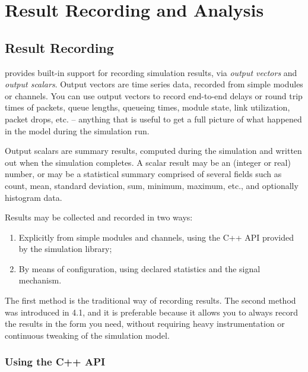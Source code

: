 \chapter{Result Recording and Analysis}
\label{cha:analyzing-simulation-results}

\section{Result Recording}

{\opp} provides built-in support for recording simulation results, via
\textit{output vectors} and \textit{output scalars}. Output vectors are
time series data, recorded from simple modules or channels. You can use
output vectors to record end-to-end delays or round trip times of packets,
queue lengths, queueing times, module state, link utilization, packet
drops, etc. -- anything that is useful to get a full picture of what
happened in the model during the simulation run.

Output scalars are summary results, computed during the simulation and
written out when the simulation completes. A scalar result may be an
(integer or real) number, or may be a statistical summary comprised of
several fields such as count, mean, standard deviation, sum, minimum,
maximum, etc., and optionally histogram data.

Results may be collected and recorded in two ways:

\begin{enumerate}
  \item Explicitly from simple modules and channels, using the C++ API
    provided by the simulation library;
  \item By means of configuration, using declared statistics and the
    signal mechanism.
\end{enumerate}

The first method is the traditional way of recording results. The second method
was introduced in {\opp} 4.1, and it is preferable because it allows you
to always record the results in the form you need, without requiring heavy
instrumentation or continuous tweaking of the simulation model.

\subsection{Using the C++ API}

